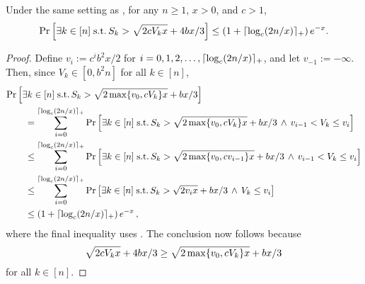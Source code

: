 \begin{corollary}
  \label{cor:freedman}
  Under the same setting as , for any $n \geq 1$,
  $x > 0$, and $c > 1$,
  \[
    \Pr\left[
      \exists k \in [n] \;\mathrm{s.t.}\,
      S_k > \sqrt{2cV_kx} + 4bx/3
    \right]
    \leq
    \left( 1 + \lceil\log_c(2n/x)\rceil_+ \right)
    e^{-x}
    .
  \]
\end{corollary}
\begin{proof}
  Define $v_i := c^i b^2x/2$ for $i = 0, 1, 2, \dotsc, \lceil
  \log_c(2n/x) \rceil_+$, and let $v_{-1} := -\infty$.
  Then, since $V_k \in [0,b^2n]$ for all $k\in[n]$,
  \begin{align*}
    \MoveEqLeft{
      \Pr\Brackets{
        \exists k \in [n] \;\st\,
        S_k > \sqrt{2\max\braces{v_0,cV_k}x} + bx/3
      }
    }
    \\
    & =
    \sum_{i=0}^{\ceil{\log_c(2n/x)}_+}
    \Pr\Brackets{
      \exists k \in [n] \;\st\,
      S_k > \sqrt{2\max\braces{v_0,cV_k}x} + bx/3
      \,\wedge\, v_{i-1} < V_k \leq v_i
    }
    \\
    & \leq
    \sum_{i=0}^{\ceil{\log_c(2n/x)}_+}
    \Pr\Brackets{
      \exists k \in [n] \;\st\,
      S_k > \sqrt{2\max\braces{v_0,cv_{i-1}}x} + bx/3
      \,\wedge\, v_{i-1} < V_k \leq v_i
    }
    \\
    & \leq
    \sum_{i=0}^{\ceil{\log_c(2n/x)}_+}
    \Pr\Brackets{
      \exists k \in [n] \;\st\,
      S_k > \sqrt{2v_ix} + bx/3
      \,\wedge\, V_k \leq v_i
    }
    \\
    & \leq
    \Parens{ 1 + \ceil{\log_c(2n/x)}_+ }
    e^{-x}\,,
  \end{align*}
  where the final inequality uses .
  The conclusion now follows because
  \[
    \sqrt{2cV_kx} + 4bx/3
    \geq \sqrt{2\max\{v_0,cV_k\}x} + bx/3
  \]
  for all $k \in [n]$.
\end{proof}

